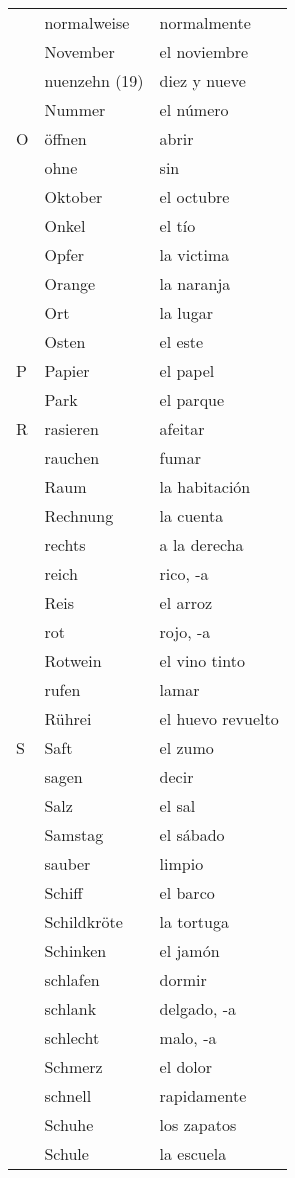 \documentclass[10pt,spanish]{article}
\begin{document}
\begin{longtable}{p{} p{} | p{}}
& normalweise & normalmente \\
& November & el noviembre  \\
& nuenzehn (19) & diez y nueve  \\
& Nummer & el número  \\
O & öffnen & abrir  \\
& ohne & sin  \\
& Oktober & el octubre  \\
& Onkel & el tío  \\
& Opfer & la victima \\
& Orange & la naranja  \\
& Ort & la lugar  \\
& Osten & el este  \\
P & Papier & el papel  \\
& Park & el parque  \\
R & rasieren & afeitar \\
& rauchen & fumar  \\
& Raum & la habitación  \\
& Rechnung & la cuenta  \\
& rechts & a la derecha \\
& reich & rico, -a  \\
& Reis & el arroz  \\
& rot & rojo, -a  \\
& Rotwein & el vino tinto  \\
& rufen & lamar  \\
& Rührei & el huevo revuelto\\
S & Saft & el zumo  \\
& sagen & decir  \\
& Salz & el sal  \\
& Samstag & el sábado  \\
& sauber & limpio  \\
& Schiff & el barco  \\
& Schildkröte & la tortuga  \\
& Schinken & el jamón \\
& schlafen & dormir  \\
& schlank & delgado, -a \\
& schlecht & malo, -a \\
& Schmerz & el dolor  \\
& schnell & rapidamente  \\
& Schuhe & los zapatos  \\
& Schule & la escuela  \\

\end{longtable}
\end{document}
